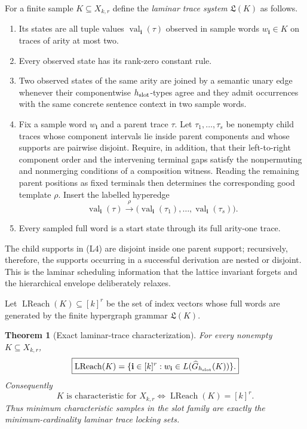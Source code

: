 \documentclass[11pt]{article}
\newtheorem{theorem}[definition]{Theorem}
\begin{document}
For a finite sample $K\subseteq X_{k,r}$ define the \emph{laminar trace system}
$\mathfrak L(K)$ as follows.
\begin{enumerate}[label=\textup{(L\arabic*)},leftmargin=*]
\item Its states are all tuple values $\operatorname{val}_{\mathbf i}(\tau)$ observed in
      sample words $w_{\mathbf i}\in K$ on traces of arity at most two.
\item Every observed state has its rank-zero constant rule.
\item Two observed states of the same arity are joined by a semantic unary
      edge whenever their componentwise $h_{\rm slot}$-types agree and they
      admit occurrences with the same concrete sentence context in two sample
      words.
\item Fix a sample word $w_{\mathbf i}$ and a parent trace $\tau$.  Let
      $\tau_1,\ldots,\tau_s$ be nonempty child traces whose component
      intervals lie inside parent components and whose supports are pairwise
      disjoint.  Require, in addition, that their left-to-right component order
      and the intervening terminal gaps satisfy the nonpermuting and nonmerging
      conditions of a composition witness.  Reading the remaining parent
      positions as fixed terminals then determines the corresponding good
      template $\rho$.  Insert the labelled hyperedge
      \[
        \operatorname{val}_{\mathbf i}(\tau)
        \xrightarrow{\rho}
        \bigl(\operatorname{val}_{\mathbf i}(\tau_1),\ldots,
              \operatorname{val}_{\mathbf i}(\tau_s)\bigr).
      \]
\item Every sampled full word is a start state through its full arity-one
      trace.
\end{enumerate}
The child supports in (L4) are disjoint inside one parent support; recursively,
therefore, the supports occurring in a successful derivation are nested or
disjoint.  This is the laminar scheduling information that the lattice
invariant forgets and the hierarchical envelope deliberately relaxes.

Let $\operatorname{LReach}(K)\subseteq[k]^r$ be the set of index vectors whose full words are
generated by the finite hypergraph grammar $\mathfrak L(K)$.

\begin{theorem}[Exact laminar-trace characterization]
\label{thm:laminar-trace-exact}
For every nonempty $K\subseteq X_{k,r}$,
\[
  \boxed{
  \operatorname{LReach}(K)
  =
  \{\mathbf i\in[k]^r:
      w_{\mathbf i}\in L(\widehat G_{h_{\rm slot}}(K))\}.
  }
\]
Consequently
\[
  \boxed{
    K\text{ is characteristic for }X_{k,r}
    \iff
    \operatorname{LReach}(K)=[k]^r.
  }
\]
Thus minimum characteristic samples in the slot family are exactly the
minimum-cardinality laminar trace locking sets.
\end{theorem}
\end{document}
